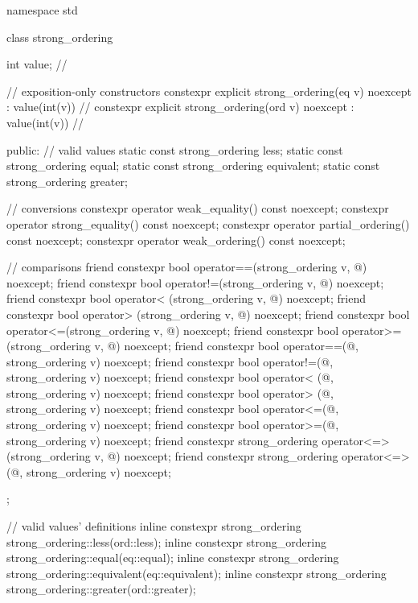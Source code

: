 %
%
%
%
%
\begin{codeblock}
namespace std {
  class strong_ordering {
    int value;  // \expos

    // exposition-only constructors
    constexpr explicit strong_ordering(eq v) noexcept : value(int(v)) {}    // \expos
    constexpr explicit strong_ordering(ord v) noexcept : value(int(v)) {}   // \expos

  public:
    // valid values
    static const strong_ordering less;
    static const strong_ordering equal;
    static const strong_ordering equivalent;
    static const strong_ordering greater;

    // conversions
    constexpr operator weak_equality() const noexcept;
    constexpr operator strong_equality() const noexcept;
    constexpr operator partial_ordering() const noexcept;
    constexpr operator weak_ordering() const noexcept;

    // comparisons
    friend constexpr bool operator==(strong_ordering v, @\unspec@) noexcept;
    friend constexpr bool operator!=(strong_ordering v, @\unspec@) noexcept;
    friend constexpr bool operator< (strong_ordering v, @\unspec@) noexcept;
    friend constexpr bool operator> (strong_ordering v, @\unspec@) noexcept;
    friend constexpr bool operator<=(strong_ordering v, @\unspec@) noexcept;
    friend constexpr bool operator>=(strong_ordering v, @\unspec@) noexcept;
    friend constexpr bool operator==(@\unspec@, strong_ordering v) noexcept;
    friend constexpr bool operator!=(@\unspec@, strong_ordering v) noexcept;
    friend constexpr bool operator< (@\unspec@, strong_ordering v) noexcept;
    friend constexpr bool operator> (@\unspec@, strong_ordering v) noexcept;
    friend constexpr bool operator<=(@\unspec@, strong_ordering v) noexcept;
    friend constexpr bool operator>=(@\unspec@, strong_ordering v) noexcept;
    friend constexpr strong_ordering operator<=>(strong_ordering v, @\unspec@) noexcept;
    friend constexpr strong_ordering operator<=>(@\unspec@, strong_ordering v) noexcept;
  };

  // valid values' definitions
  inline constexpr strong_ordering strong_ordering::less(ord::less);
  inline constexpr strong_ordering strong_ordering::equal(eq::equal);
  inline constexpr strong_ordering strong_ordering::equivalent(eq::equivalent);
  inline constexpr strong_ordering strong_ordering::greater(ord::greater);
}
\end{codeblock}

